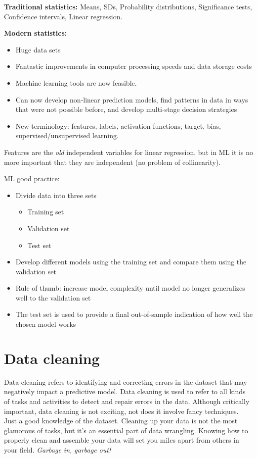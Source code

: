 \textbf{Traditional statistics:} Means, SDs, Probability distributions, Significance tests, Confidence intervals, Linear regression.

\textbf{Modern statistics:}
\begin{itemize}
    \item Huge data sets 
    \item Fantastic improvements in computer processing speeds and data storage costs
    \item Machine learning tools are now feasible.
    \item Can now develop non-linear prediction models, find patterns in data in ways that were not possible before, and develop multi-stage decision strategies
    \item New terminology: features, labels, activation functions, target, bias, supervised/unsupervised learning.
\end{itemize}

Features are the \textit{old} independent variables for linear regression, but in ML it is no more important that they are independent (no problem of collinearity).

ML good practice:
\begin{itemize}
    \item Divide data into three sets
          \begin{itemize}
              \item Training set
              \item Validation set
              \item Test set
          \end{itemize}
    \item Develop different models using the training set and compare them using the validation set
    \item Rule of thumb: increase model complexity until model no longer generalizes well to the validation set
    \item The test set is used to provide a final out-of-sample indication of how well the chosen model works
\end{itemize}
\section{Data cleaning}

Data cleaning refers to identifying and correcting errors in the dataset that may negatively impact a predictive model. Data cleaning is used to refer to all kinds of tasks and activities to detect and repair errors in the data. Although critically important, data cleaning is not exciting, not does it involve fancy techniques. Just a good knowledge of the dataset. Cleaning up your data is not the most glamorous of tasks, but it’s an essential part of data wrangling. Knowing how to properly clean and assemble your data will set you miles apart from others in your field. \textit{Garbage in, garbage out!}

